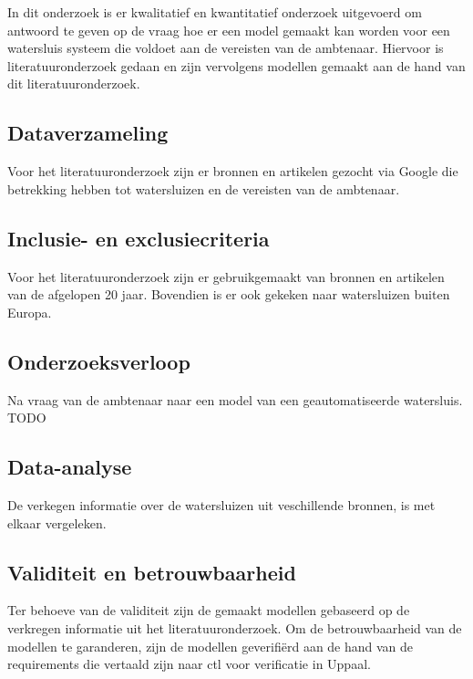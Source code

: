 \documentclass[../verslag.tex]{subfiles}
\begin{document}
In dit onderzoek is er kwalitatief en kwantitatief onderzoek uitgevoerd om antwoord te geven op de vraag hoe er een model gemaakt kan worden voor een watersluis systeem die voldoet aan de vereisten van de ambtenaar.
Hiervoor is literatuuronderzoek gedaan en zijn vervolgens modellen gemaakt aan de hand van dit literatuuronderzoek.

\subsection{Dataverzameling}
Voor het literatuuronderzoek zijn er bronnen en artikelen gezocht via Google die betrekking hebben tot watersluizen en de vereisten van de ambtenaar.

\subsection{Inclusie- en exclusiecriteria}
Voor het literatuuronderzoek zijn er gebruikgemaakt van bronnen en artikelen van de afgelopen 20 jaar. 
Bovendien is er ook gekeken naar watersluizen buiten Europa.
\subsection{Onderzoeksverloop}
Na vraag van de ambtenaar naar een model van een geautomatiseerde watersluis. TODO
\subsection{Data-analyse}
De verkegen informatie over de watersluizen uit veschillende bronnen, is met elkaar vergeleken.
\subsection{Validiteit en betrouwbaarheid}
Ter behoeve van de validiteit zijn de gemaakt modellen gebaseerd op de verkregen informatie uit het literatuuronderzoek.
Om de betrouwbaarheid van de modellen te garanderen, zijn de modellen geverifiërd aan de hand van de requirements die vertaald zijn naar ctl voor verificatie in Uppaal.
\end{document}
